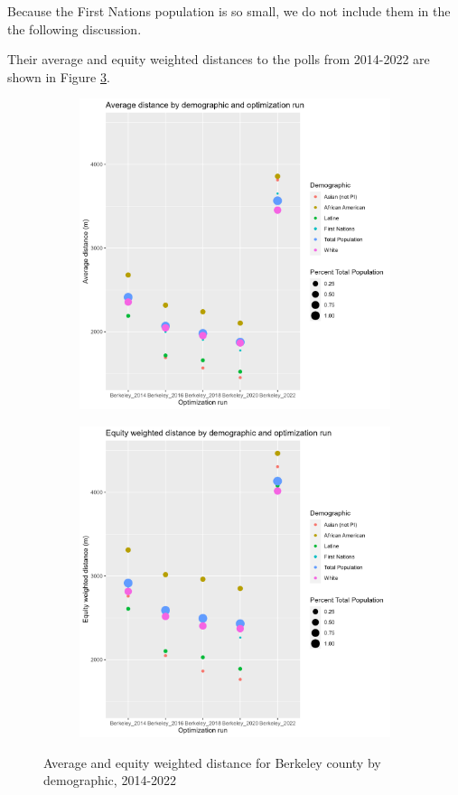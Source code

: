 \documentclass[11pt]{article}
\theoremstyle{remark}
\theoremstyle{definition}
\begin{document}
Because the First Nations population is so small, we do not include them in the the following discussion.

Their average and equity weighted distances to the polls from 2014-2022 are shown in Figure \ref{fig:Berkeley distance graphs}.

\begin{figure}
	\begin{subfigure}{.8\textwidth}
		\centering
		\includegraphics[width=.8\linewidth]{result analysis/Berkeley_SC_original_configs/orig_pop_scaled_avg}
		\label{sfig:Berkeley avg dist}
	\end{subfigure} \newline
	\begin{subfigure}{.8\textwidth}
		\centering
		\includegraphics[width=.8\linewidth]{result analysis/Berkeley_SC_original_configs/orig_pop_scaled_y_EDE}
		\label{sfig:Berkeley equity dist}
	\end{subfigure}
	\caption{Average and equity weighted distance for Berkeley county by demographic, 2014-2022}
	\label{fig:Berkeley distance graphs}
\end{figure}
\end{document}

